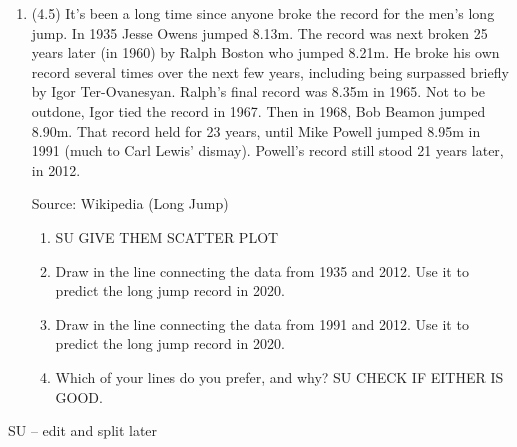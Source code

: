 \documentclass[12pt]{article}
\begin{document}
\begin{enumerate}
\item  (4.5) It's been a long time since anyone broke the record for the men's long jump.  In 1935 Jesse Owens jumped  8.13m.  The record was next broken 25 years later (in 1960) by Ralph Boston who jumped 8.21m. He broke his own record several times over the next few years, including being surpassed briefly by Igor Ter-Ovanesyan.  Ralph's final record was 8.35m in 1965. Not to be outdone, Igor tied the record in 1967. Then in 1968, Bob Beamon jumped 8.90m.  That record held for 23 years, until Mike Powell jumped 8.95m in 1991 (much to Carl Lewis' dismay).  Powell's record still stood 21 years later, in 2012. \hfill \begin{footnotesize} Source:  Wikipedia (Long Jump) \end{footnotesize}
\begin{enumerate}
\item SU GIVE THEM SCATTER PLOT
\item Draw in the line connecting the data from 1935 and 2012.  Use it to predict the long jump record in 2020.
\item Draw in the line connecting the data from 1991 and 2012.  Use it to predict the long jump record in 2020.
\item Which of your lines do you prefer, and why?  SU CHECK IF EITHER IS GOOD.
\end{enumerate}

\end{enumerate}

SU -- edit and split later
\end{document}
